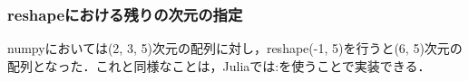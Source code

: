 \subsubsection{reshapeにおける残りの次元の指定}numpyにおいては(2, 3, 5)次元の配列に対し，reshape(-1, 5)を行うと(6, 5)次元の配列となった．これと同様なことは，Juliaでは:を使うことで実装できる．